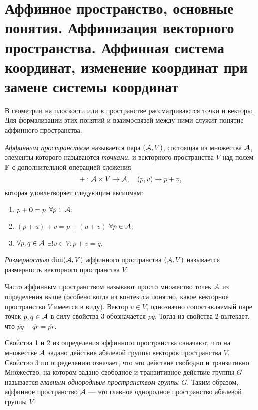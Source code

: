 \section{Аффинное пространство, основные понятия. Аффинизация векторного пространства. Аффинная система координат, изменение координат при замене системы координат}

В геометрии на плоскости или в пространстве рассматриваются точки и векторы. Для формализации этих понятий и взаимосвязей между ними служит понятие аффинного пространства.

\begin{definition}
    \textit{Аффинным пространством} называется пара $(\mathcal{A}, V)$, состоящая из множества $\mathcal{A}$, элементы которого называются \textit{точками}, и векторного пространства $V$ над полем $\mathbb{F}$ с дополнительной операцией сложения
    \[
        +: \mathcal{A} \times V \to \mathcal{A},\quad (p, v) \to p + v,
    \]
    которая удовлетворяет следующим аксиомам:
    \begin{enumerate}[nolistsep]
        \item $p + \boldsymbol{0} = p$ $\forall p \in \mathcal{A}$;
        \item $(p + u) + v = p + (u + v)$ $\forall p \in \mathcal{A}$;
        \item $\forall p, q \in \mathcal{A}$ $\exists!v \in V : p + v = q$.
    \end{enumerate}

    \textit{Размерностью} $\dim(\mathcal{A}, V)$ аффинного пространства $(\mathcal{A}, V)$ называется размерность векторного пространства $V$.
\end{definition}

Часто аффинным пространством называют просто множество точек $\mathcal{A}$ из определения выше (особено когда из контектса понятно, какое векторное пространство $V$ имеется в виду). Вектор $v \in V$, однозначно сопоставляемый паре точек $p, q \in \mathcal{A}$ в силу свойства 3 обозначается $\overline{pq}$. Тогда из свойства 2 вытекает, что $\overline{pq} + \overline{qr} = \overline{pr}$.

\begin{remark}
    Свойства 1 и 2 из определения аффинного пространства означают, что на множестве $\mathcal{A}$ задано действие абелевой группы векторов пространства $V$. Свойство 3 по определению означает, что это действие свободно и транзитивно. Множество, на котором задано свободное и транзитивное действие группы $G$ называется \textit{главным однородным пространством группы $G$}. Таким образом, аффинное пространство $\mathcal{A}$ --- это главное однородное пространство абелевой группы $V$.
\end{remark}

